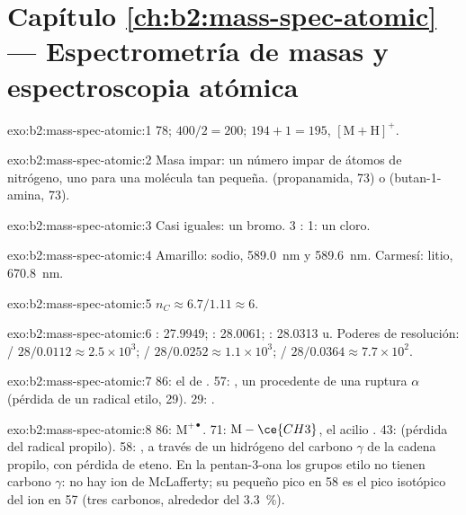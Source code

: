\section*{Capítulo \ref{ch:b2:mass-spec-atomic} --- Espectrometría de masas y espectroscopia atómica}

\begin{solution}{exo:b2:mass-spec-atomic:1}
78; $400/2 = 200$; $194 + 1 = 195$, $[\mathrm M + \mathrm H]^+$.
\end{solution}

\begin{solution}{exo:b2:mass-spec-atomic:2}
Masa impar: un número impar de átomos de nitrógeno, uno para una molécula tan pequeña.  (propanamida, 73)
o  (butan-1-amina, 73).
\end{solution}

\begin{solution}{exo:b2:mass-spec-atomic:3}
Casi iguales: un bromo. 3 : 1: un cloro.
\end{solution}

\begin{solution}{exo:b2:mass-spec-atomic:4}
Amarillo: sodio, \qty{589.0}{nm} y \qty{589.6}{nm}. Carmesí: litio, \qty{670.8}{nm}.
\end{solution}

\begin{solution}{exo:b2:mass-spec-atomic:5}
$n_C \approx 6.7/1.11 \approx 6$.
\end{solution}

\begin{solution}{exo:b2:mass-spec-atomic:6}
: 27.9949; : 28.0061; : 28.0313 u. Poderes de resolución: / $28/0.0112
\approx 2.5 \times 10^3$; / $28/0.0252 \approx 1.1 \times 10^3$; /
$28/0.0364 \approx 7.7 \times 10^2$.
\end{solution}

\begin{solution}{exo:b2:mass-spec-atomic:7}
86: el  de . 57: , un  procedente de una ruptura $\alpha$ (pérdida de
un radical etilo, 29). 29: .
\end{solution}

\begin{solution}{exo:b2:mass-spec-atomic:8}
86: $\mathrm M^{+\bullet}$. 71: $\mathrm M - \ce{CH3}$, el acilio . 43: 
(pérdida del radical propilo). 58: , a través de un hidrógeno del carbono $\gamma$ de la
cadena propilo, con pérdida de eteno. En la pentan-3-ona los grupos etilo no tienen carbono $\gamma$: no hay
ion de McLafferty; su pequeño pico en 58 es el pico isotópico  del ion en 57 (tres carbonos,
alrededor del 3.3~\%).
\end{solution}


